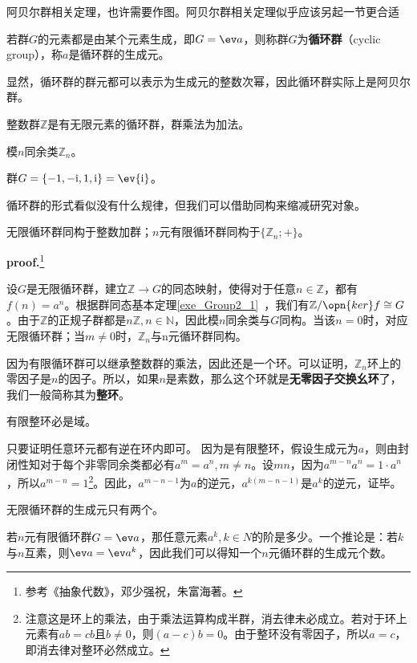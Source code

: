 
\begin{issues}
\issueTODO 阿贝尔群相关定理，也许需要作图。阿贝尔群相关定理似乎应该另起一节更合适
\end{issues}

\begin{definition}{}
若群$G$的元素都是由某个元素生成，即$G=\ev  a$，则称群$G$为\textbf{循环群}（cyclic group），称$a$是循环群的生成元。
\end{definition}

显然，循环群的群元都可以表示为生成元的整数次幂，因此循环群实际上是阿贝尔群。
\begin{example}{}
整数群$\mathbb Z$是有无限元素的循环群，群乘法为加法。
\end{example}
\begin{example}{}
模$n$同余类$\mathbb Z_n$。
\end{example}
\begin{example}{}
群$G=\{-1,-\mathrm i,1,\mathrm i\}=\ev {\mathrm i}$。
\end{example}
循环群的形式看似没有什么规律，但我们可以借助同构来缩减研究对象。
\begin{theorem}{}
无限循环群同构于整数加群；$n$元有限循环群同构于$\{\mathbb Z_n;+\}$。
\end{theorem}
\textbf{proof.}\footnote{参考《抽象代数》，邓少强祝，朱富海著。}

设$G$是无限循环群，建立$\mathbb Z\rightarrow G$的同态映射，使得对于任意$n\in \mathbb Z$，都有$f(n)=a^n$。根据群同态基本定理\autoref{exe_Group2_1}~，我们有$\mathbb Z/\opn{ker}f\cong G$。由于$\mathbb Z$的正规子群都是$n\mathbb Z,n\in \mathbb N$，因此模$n$同余类与$G$同构。当该$n=0$时，对应无限循环群；当$m\neq 0$时，$\mathbb Z_n$与n元循环群同构。

因为有限循环群可以继承整数群的乘法，因此还是一个环。可以证明，$\mathbb Z_n$环上的零因子是$n$的因子。所以，如果$n$是素数，那么这个环就是\textbf{无零因子交换幺环}了，我们一般简称其为\textbf{整环}。
\begin{theorem}{}
有限整环必是域。
\end{theorem}
只要证明任意环元都有逆在环内即可。
因为是有限整环，假设生成元为$a$，则由封闭性知对于每个非零同余类都必有$a^m=a^n,m\neq n$。设$m n$，因为$a^{m-n}a^n=1\cdot a^n$，所以$a^{m-n}=1$\footnote{注意这是环上的乘法，由于乘法运算构成半群，消去律未必成立。若对于环上元素有$ab=cb$且$b\neq 0$，则$(a-c)b=0$。由于整环没有零因子，所以$a=c$，即消去律对整环必然成立。}。因此，$a^{m-n-1}$为$a$的逆元，$a^{k(m-n-1)}$是$a^k$的逆元，证毕。
\begin{exercise}{}
无限循环群的生成元只有两个。
\end{exercise}
\begin{exercise}{}
若$n$元有限循环群$G=\ev a$，那任意元素$a^k,k\in N$的阶是多少。一个推论是：若$k$与$n$互素，则$\ev a=\ev a^k$，因此我们可以得知一个$n$元循环群的生成元个数。
\end{exercise}
